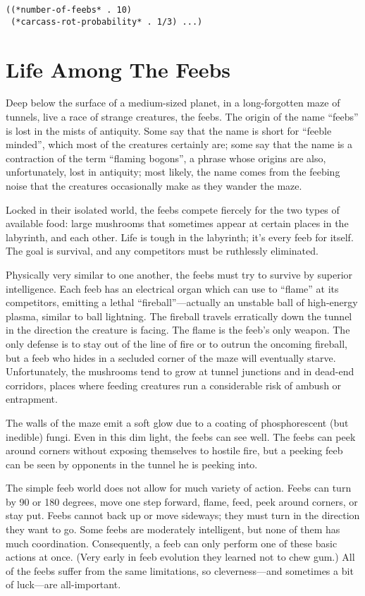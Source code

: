 \documentclass[12pt]{article}
\begin{document}
\begin{verbatim}
((*number-of-feebs* . 10)
 (*carcass-rot-probability* . 1/3) ...)
\end{verbatim}

\section{Life Among The Feebs}

Deep below the surface of a medium-sized planet, in a long-forgotten
maze of tunnels, live a race of strange creatures, the feebs.  The
origin of the name ``feebs'' is lost in the mists of antiquity.  Some
say that the name is short for ``feeble minded'', which most of the
creatures certainly are; some say that the name is a contraction of
the term ``flaming bogons'', a phrase whose origins are also,
unfortunately, lost in antiquity; most likely, the name comes from the
feebing noise that the creatures occasionally make as they wander the
maze.

Locked in their isolated world, the feebs compete fiercely for the
two types of available food: large mushrooms that sometimes appear at
certain places in the labyrinth, and each other.  Life is tough in the
labyrinth; it's every feeb for itself.  The goal is survival, and any
competitors must be ruthlessly eliminated.

Physically very similar to one another, the feebs must try to survive
by superior intelligence.  Each feeb has an electrical organ which can
use to ``flame'' at its competitors, emitting a lethal
``fireball''---actually an unstable ball of high-energy plasma,
similar to ball lightning.  The fireball travels erratically down the
tunnel in the direction the creature is facing.  The flame is the
feeb's only weapon.  The only defense is to stay out of the line of
fire or to outrun the oncoming fireball, but a feeb who hides in a
secluded corner of the maze will eventually starve.  Unfortunately,
the mushrooms tend to grow at tunnel junctions and in dead-end
corridors, places where feeding creatures run a considerable risk of
ambush or entrapment.

The walls of the maze emit a soft glow due to a coating of
phosphorescent (but inedible) fungi.  Even in this dim light, the feebs
can see well.  The feebs can peek around corners without exposing
themselves to hostile fire, but a peeking feeb can be seen by opponents
in the tunnel he is peeking into.

The simple feeb world does not allow for much variety of action.
Feebs can turn by 90 or 180 degrees, move one step forward, flame,
feed, peek around corners, or stay put.  Feebs cannot back up or move
sideways; they must turn in the direction they want to go.  Some feebs
are moderately intelligent, but none of them has much coordination.
Consequently, a feeb can only perform one of these basic actions at
once.  (Very early in feeb evolution they learned not to chew gum.)
All of the feebs suffer from the same limitations, so cleverness---and
sometimes a bit of luck---are all-important.
\end{document}
